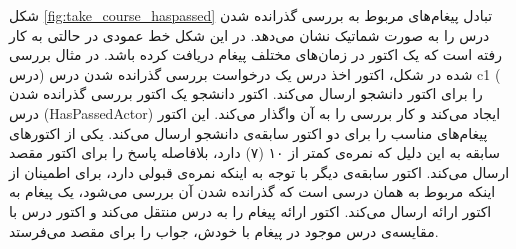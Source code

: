 شکل \ref{fig:take_course_haspassed} تبادل پیغام‌های مربوط به بررسی گذرانده شدن درس را به صورت شماتیک نشان می‌دهد. در این شکل خط عمودی در حالتی به کار رفته‌ است که یک اکتور در زمان‌های مختلف پیغام دریافت کرده باشد. در مثال بررسی شده در شکل، اکتور اخذ درس یک درخواست بررسی گذرانده شدن درس (درس c1 ( را برای اکتور دانشجو ارسال می‌کند. اکتور دانشجو یک اکتور بررسی گذرانده شدن درس (HasPassedActor) ایجاد می‌کند و کار بررسی را به آن واگذار می‌کند. این اکتور پیغام‌های مناسب را برای دو اکتور سابقه‌ی دانشجو ارسال می‌کند. یکی از اکتورهای سابقه به این دلیل که نمره‌ی کمتر از ۱۰ (۷) دارد، بلافاصله پاسخ را برای اکتور مقصد ارسال می‌کند. اکتور سابقه‌ی دیگر با توجه به اینکه نمره‌ی قبولی دارد،‌ برای اطمینان از اینکه مربوط به همان درسی است که گذرانده شدن آن بررسی می‌شود، یک پیغام به اکتور ارائه ارسال می‌کند. اکتور ارائه پیغام را به درس منتقل می‌کند و اکتور درس با مقایسه‌ی درس موجود در پیغام با خودش، جواب را برای مقصد می‌فرستد.
\FloatBarrier
